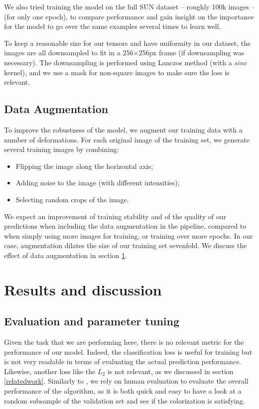 \documentclass[10pt,twocolumn,letterpaper]{article}
\begin{document}
We also tried training the model on the full SUN dataset -- roughly 100k images -- (for only one epoch), to compare performance and gain insight on the importance for the model to go over the same examples several times to learn well.


To keep a reasonable size for our tensors and have uniformity in our dataset, the images are all downsampled to fit in a 256$\times$256px frame (if downsampling was necessary). The downsampling is performed using Lanczos method (with a $sinc$ kernel), and we use a mask for non-square images to make sure the loss is relevant.

\subsection{Data Augmentation}

To improve the robustness of the model, we augment our training data with a number of deformations. For each original image of the training set, we generate several training images by combining:
\begin{itemize}
\item Flipping the image along the horizontal axis;
\item Adding noise to the image (with different intensities);
\item Selecting random crops of the image.
\end{itemize}

We expect an improvement of training stability and of the quality of our predictions when including the data augmentation in the pipeline, compared to when simply using more images for training, or training over more epochs. In our case, augmentation dilates the size of our training set sevenfold. We discuss the effect of data augmentation in section \ref{results}.

\section{Results and discussion}\label{results}

\subsection{Evaluation and parameter tuning}

Given the task that we are performing here, there is no relevant metric for the performance of our model. Indeed, the classification loss is useful for training but is not very readable in terms of evaluating the actual prediction performance. Likewise, another loss like the $L_2$ is not relevant, as we discussed in section \ref{relatedwork}. Similarly to \cite{zhang2016colorful}, we rely on human evaluation to evaluate the overall performance of the algorithm, as it is both quick and easy to have a look at a random subsample of the validation set and see if the colorization is satisfying.
\end{document}
